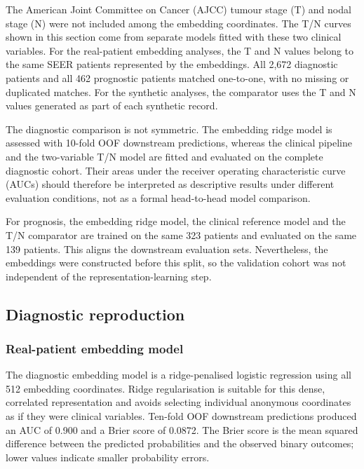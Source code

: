 The American Joint Committee on Cancer (AJCC) tumour stage (T) and nodal stage
(N) were not included among the embedding coordinates.  The T/N curves shown in
this section come from separate models fitted with these two clinical variables.
For the real-patient embedding analyses, the T and N values belong to the same
SEER patients represented by the embeddings.  All 2,672 diagnostic patients and
all 462 prognostic patients matched one-to-one, with no missing or duplicated
matches.  For the synthetic analyses, the comparator uses the T and N values
generated as part of each synthetic record.

The diagnostic comparison is not symmetric.  The embedding ridge model is
assessed with 10-fold OOF downstream predictions, whereas the clinical pipeline
and the two-variable T/N model are fitted and evaluated on the complete diagnostic
cohort.  Their areas under the receiver operating characteristic curve (AUCs)
should therefore be interpreted as descriptive results under different evaluation
conditions, not as a formal head-to-head model comparison.

For prognosis, the embedding ridge model, the clinical reference model and the
T/N comparator are trained on the same 323 patients and evaluated on the same 139
patients.  This aligns the downstream evaluation sets.  Nevertheless, the
embeddings were constructed before this split, so the validation cohort was not
independent of the representation-learning step.

\subsection{Diagnostic reproduction}

\subsubsection{Real-patient embedding model}

The diagnostic embedding model is a ridge-penalised logistic regression using all
512 embedding coordinates.  Ridge regularisation is suitable for this dense,
correlated representation and avoids selecting individual anonymous coordinates
as if they were clinical variables.  Ten-fold OOF downstream predictions produced
an AUC of 0.900 and a Brier score of 0.0872.  The Brier score is the mean squared
difference between the predicted probabilities and the observed binary outcomes;
lower values indicate smaller probability errors.

